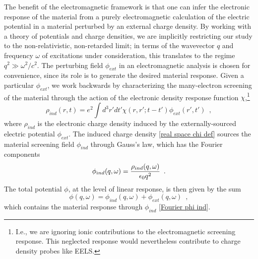 \documentclass{article}
\begin{document}
The benefit of the electromagnetic framework is that one can infer the electronic response of the material from a purely electromagnetic calculation of the electric potential in a material perturbed by an external charge density.  By working with a theory of potentials and charge densities, we are implicitly restricting our study to the non-relativistic, non-retarded limit; in terms of the wavevector $q$ and frequency $\omega$ of excitations under consideration, this translates to the regime $q^2\gg \omega^2/c^2$.  The perturbing field $\phi_{ext}$ in an electromagnetic analysis is chosen for convenience, since its role is to generate the desired material response.  Given a particular $\phi_{ext}$, we work backwards by characterizing the many-electron screening of the material through the action of the electronic density response function $\chi$,\footnote{I.e., we are ignoring ionic contributions to the electromagnetic screening response.  This neglected response would nevertheless contribute to charge density probes like EELS.}
\begin{equation}
    \label{real space chi def}
    \rho_{ind}(r,t) = e^2\int d^3 r' dt' \chi(r,r';t-t')\phi_{ext}(r',t')
    \,\,\,,
\end{equation}
where $\rho_{ind}$ is the electronic charge density induced by the externally-sourced electric potential $\phi_{ext}$.  The induced charge density \eqref{real space chi def} sources the material screening field $\phi_{ind}$ through Gauss's law, which has the Fourier components
\begin{equation}
    \label{Fourier phi ind}
    \phi_{ind}(q,\omega) = \frac{\rho_{ind}(q,\omega)}{\epsilon_0 q^2}
    \,\,\,.
\end{equation}
The total potential $\phi$, at the level of linear response, is then given by the sum
\begin{equation}
    \label{phi def}
    \phi(q,\omega) = \phi_{ind}(q,\omega) + \phi_{ext}(q,\omega)
    \,\,\,,
\end{equation}
which contains the material response through $\phi_{ind}$ \eqref{Fourier phi ind}.  
\end{document}
